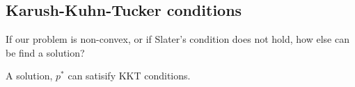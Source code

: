 
\subsection{Karush-Kuhn-Tucker conditions}

If our problem is non-convex, or if Slater's condition does not hold, how else can be find a solution?

A solution, \(p^*\) can satisify KKT conditions.

